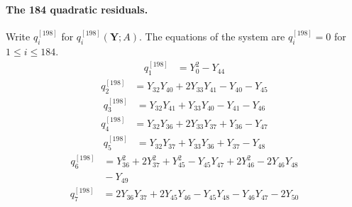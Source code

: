 \paragraph{The 184 quadratic residuals.}
Write $q_i^{[198]}$ for $q_i^{[198]}(\mathbf Y;A)$.  The equations
of the system are $q_i^{[198]}=0$ for $1\leq i\leq184$.
\begin{equation}\label{q198:row:001}
\begin{aligned}
q_{1}^{[198]} &={} Y_{0}^{2} - Y_{44}
\end{aligned}
\end{equation}
\begin{equation}\label{q198:row:002}
\begin{aligned}
q_{2}^{[198]} &={} Y_{32}Y_{40} + 2Y_{33}Y_{41} - Y_{40} - Y_{45}
\end{aligned}
\end{equation}
\begin{equation}\label{q198:row:003}
\begin{aligned}
q_{3}^{[198]} &={} Y_{32}Y_{41} + Y_{33}Y_{40} - Y_{41} - Y_{46}
\end{aligned}
\end{equation}
\begin{equation}\label{q198:row:004}
\begin{aligned}
q_{4}^{[198]} &={} Y_{32}Y_{36} + 2Y_{33}Y_{37} + Y_{36} - Y_{47}
\end{aligned}
\end{equation}
\begin{equation}\label{q198:row:005}
\begin{aligned}
q_{5}^{[198]} &={} Y_{32}Y_{37} + Y_{33}Y_{36} + Y_{37} - Y_{48}
\end{aligned}
\end{equation}
\begin{equation}\label{q198:row:006}
\begin{aligned}
q_{6}^{[198]} &={} Y_{36}^{2} + 2Y_{37}^{2} + Y_{45}^{2} - Y_{45}Y_{47} + 2Y_{46}^{2} - 2Y_{46}Y_{48}\\
&{} - Y_{49}
\end{aligned}
\end{equation}
\begin{equation}\label{q198:row:007}
\begin{aligned}
q_{7}^{[198]} &={} 2Y_{36}Y_{37} + 2Y_{45}Y_{46} - Y_{45}Y_{48} - Y_{46}Y_{47} - 2Y_{50}
\end{aligned}
\end{equation}
